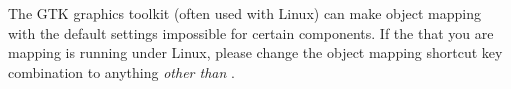 % 
%
%

The GTK graphics toolkit (often used with Linux) can make object mapping with the default \jb{} settings impossible for certain components. If the \gdaut{} that you are mapping is running under Linux, please change the object mapping shortcut key combination to anything \emph{other than} .
